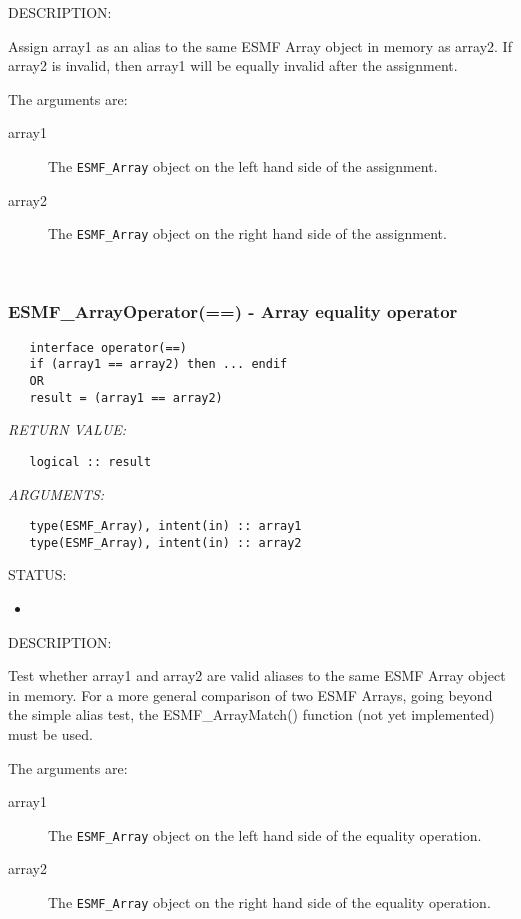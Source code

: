 {\sf DESCRIPTION:\\ }


   Assign array1 as an alias to the same ESMF Array object in memory
   as array2. If array2 is invalid, then array1 will be equally invalid after
   the assignment.
  
   The arguments are:
   \begin{description}
   \item[array1]
   The {\tt ESMF\_Array} object on the left hand side of the assignment.
   \item[array2]
   The {\tt ESMF\_Array} object on the right hand side of the assignment.
   \end{description}
   
 
\mbox{}\hrulefill\ 
 
\subsubsection [ESMF\_ArrayOperator(==)] {ESMF\_ArrayOperator(==) - Array equality operator}


  
\begin{verbatim}   interface operator(==)
   if (array1 == array2) then ... endif
   OR
   result = (array1 == array2)\end{verbatim}{\em RETURN VALUE:}
\begin{verbatim}   logical :: result\end{verbatim}{\em ARGUMENTS:}
\begin{verbatim}   type(ESMF_Array), intent(in) :: array1
   type(ESMF_Array), intent(in) :: array2\end{verbatim}
{\sf STATUS:}
   \begin{itemize}
   \item{}
   \end{itemize}
  
{\sf DESCRIPTION:\\ }


   Test whether array1 and array2 are valid aliases to the same ESMF
   Array object in memory. For a more general comparison of two ESMF Arrays,
   going beyond the simple alias test, the ESMF\_ArrayMatch() function (not yet
   implemented) must be used.
  
   The arguments are:
   \begin{description}
   \item[array1]
   The {\tt ESMF\_Array} object on the left hand side of the equality
   operation.
   \item[array2]
   The {\tt ESMF\_Array} object on the right hand side of the equality
   operation.
   \end{description}
   
